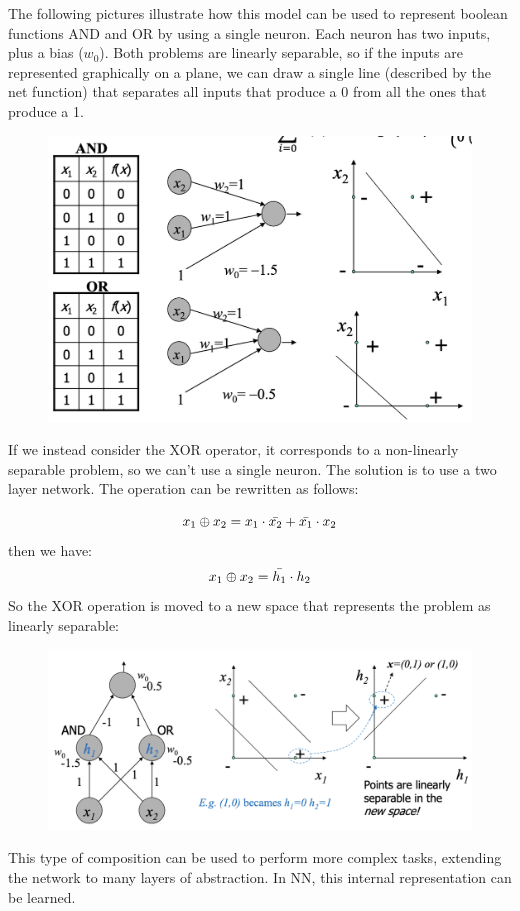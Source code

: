 The following pictures illustrate how this model can be used to represent boolean functions AND and OR by using a single neuron. Each neuron has two inputs, plus a bias ($w_0$). Both problems are linearly separable, so if the inputs are represented graphically on a plane, we can draw a single line (described by the net function) that separates all inputs that produce a 0 from all the ones that produce a 1.

\begin{figure}[ht]
    \centering
    \includegraphics[width=0.5\linewidth]{img/boolean perceptron.png}
\end{figure}

If we instead consider the XOR operator, it corresponds to a non-linearly separable problem, so we can't use a single neuron. The solution is to use a two layer network. The operation can be rewritten as follows:

\begin{equation*}
    x_1 \oplus x_2 = x_1 \cdot \Bar{x_2} + \Bar{x_1} \cdot x_2
\end{equation*}
then we have:
\begin{equation*}
    x_1 \oplus x_2 = \Bar{h_1} \cdot h_2
\end{equation*}
So the XOR operation is moved to a new space that represents the problem as linearly separable:

\begin{figure}[ht]
    \centering
    \includegraphics[width=0.5\linewidth]{img/xor perceptron.png}
\end{figure}
This type of composition can be used to perform more complex tasks, extending the network to many layers of abstraction. In NN, this internal representation can be learned.

